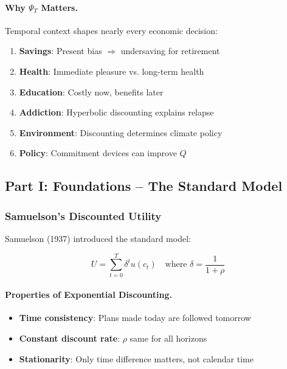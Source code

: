 \paragraph{Why $\Psi_T$ Matters.}
Temporal context shapes nearly every economic decision:
\begin{enumerate}
    \item \textbf{Savings}: Present bias $\Rightarrow$ undersaving for retirement
    \item \textbf{Health}: Immediate pleasure vs. long-term health
    \item \textbf{Education}: Costly now, benefits later
    \item \textbf{Addiction}: Hyperbolic discounting explains relapse
    \item \textbf{Environment}: Discounting determines climate policy
    \item \textbf{Policy}: Commitment devices can improve $Q$
\end{enumerate}

\subsection{Part I: Foundations – The Standard Model}

\subsubsection{Samuelson's Discounted Utility}

Samuelson (1937) introduced the standard model:

\begin{equation}
\boxed{
U = \sum_{t=0}^{T} \delta^t u(c_t) \quad \text{where } \delta = \frac{1}{1+\rho}
}
\label{eq:exponential}
\end{equation}

\paragraph{Properties of Exponential Discounting.}
\begin{itemize}
    \item \textbf{Time consistency}: Plans made today are followed tomorrow
    \item \textbf{Constant discount rate}: $\rho$ same for all horizons
    \item \textbf{Stationarity}: Only time difference matters, not calendar time
\end{itemize}

